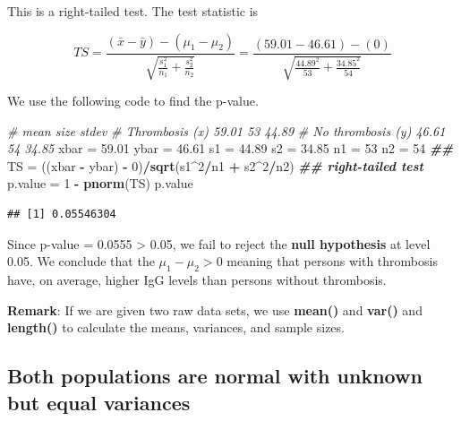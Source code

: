 \documentclass[
]{book}
\newenvironment{Shaded}{\begin{snugshade}}{\end{snugshade}}
\newcommand{\CommentTok}[1]{\textcolor[rgb]{0.56,0.35,0.01}{\textit{#1}}}
\newcommand{\DecValTok}[1]{\textcolor[rgb]{0.00,0.00,0.81}{#1}}
\newcommand{\DocumentationTok}[1]{\textcolor[rgb]{0.56,0.35,0.01}{\textbf{\textit{#1}}}}
\newcommand{\FloatTok}[1]{\textcolor[rgb]{0.00,0.00,0.81}{#1}}
\newcommand{\FunctionTok}[1]{\textcolor[rgb]{0.13,0.29,0.53}{\textbf{#1}}}
\newcommand{\NormalTok}[1]{#1}
\newcommand{\OtherTok}[1]{\textcolor[rgb]{0.56,0.35,0.01}{#1}}
\newcommand{\SpecialCharTok}[1]{\textcolor[rgb]{0.81,0.36,0.00}{\textbf{#1}}}
\begin{document}
This is a right-tailed test. The test statistic is

\[
TS = \frac{(\bar{x}-\bar{y}) -(\mu_1-\mu_2)}{\sqrt{\frac{s_1^2}{n_1}+\frac{s_2^2}{n_2}}} =
 \frac{(59.01-46.61) -(0)}{\sqrt{\frac{44.89^2}{53}+\frac{34.85^2}{54}}}
\]

We use the following code to find the p-value.

\begin{Shaded}
\begin{Highlighting}[]
\CommentTok{\#                      mean   size   stdev}
\CommentTok{\# Thrombosis (x)      59.01    53    44.89}
\CommentTok{\# No thrombosis (y)   46.61    54    34.85}
\NormalTok{xbar }\OtherTok{=} \FloatTok{59.01}
\NormalTok{ybar }\OtherTok{=} \FloatTok{46.61}
\NormalTok{s1 }\OtherTok{=} \FloatTok{44.89}
\NormalTok{s2 }\OtherTok{=} \FloatTok{34.85}
\NormalTok{n1 }\OtherTok{=} \DecValTok{53}
\NormalTok{n2 }\OtherTok{=} \DecValTok{54}
\DocumentationTok{\#\#}
\NormalTok{TS }\OtherTok{=}\NormalTok{ ((xbar }\SpecialCharTok{{-}}\NormalTok{ ybar) }\SpecialCharTok{{-}} \DecValTok{0}\NormalTok{)}\SpecialCharTok{/}\FunctionTok{sqrt}\NormalTok{(s1}\SpecialCharTok{\^{}}\DecValTok{2}\SpecialCharTok{/}\NormalTok{n1 }\SpecialCharTok{+}\NormalTok{ s2}\SpecialCharTok{\^{}}\DecValTok{2}\SpecialCharTok{/}\NormalTok{n2)}
\DocumentationTok{\#\# right{-}tailed test}
\NormalTok{p.value }\OtherTok{=} \DecValTok{1} \SpecialCharTok{{-}} \FunctionTok{pnorm}\NormalTok{(TS)}
\NormalTok{p.value}
\end{Highlighting}
\end{Shaded}

\begin{verbatim}
## [1] 0.05546304
\end{verbatim}

Since p-value = 0.0555 \textgreater{} 0.05, we fail to reject the \textbf{null hypothesis} at level 0.05. We conclude that the \(\mu_1 - \mu_2 > 0\) meaning that persons with thrombosis have, on average, higher IgG levels than persons without thrombosis.

\textbf{Remark}: If we are given two raw data sets, we use \textbf{mean()} and \textbf{var()} and \textbf{length()} to calculate the means, variances, and sample sizes.

\hypertarget{both-populations-are-normal-with-unknown-but-equal-variances}{%
\subsection{Both populations are normal with unknown but equal variances}\label{both-populations-are-normal-with-unknown-but-equal-variances}}
\end{document}

